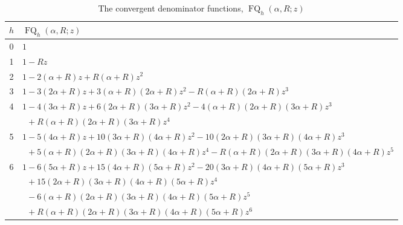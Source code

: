 \documentclass[12pt,reqno]{article}
\numberwithin{sfootnote}{section}
\newcommand{\subtablewidth}{\textwidth}
\newcommand{\subtableskip}{\bigskip}
\newcommand{\tabletopstrut}[0]{\rule{0pt}{3ex}}
\numberwithin{equation}{section}
\theoremstyle{DefaultTheoremStyle}
\theoremstyle{definition}
\newcommand{\ConvFQ}[4]{\ensuremath{\FQ_{#1}\left(#2, #3; #4\right)}}
\DeclareMathOperator{\FQ}{FQ}
\begin{document}
\begin{table}[h]
\begin{subtable}{\subtablewidth}
\begin{tabular}{|c|l|} \hline 
\hline\tabletopstrut 
$h$ & $\ConvFQ{h}{\alpha}{R}{z}$ \\ \hline 
0 & $1$ \\ 
1 & $1-Rz$ \\ 
2 & $1 - 2 (\alpha + R) z + R (\alpha + R) z^2$ \\ 
3 & $1 - 3 (2 \alpha + R) z + 3 (\alpha + R) (2 \alpha + R) z^2 - 
      R (\alpha + R) (2 \alpha + R) z^3$ \\ 
4 & $1 - 4 (3 \alpha + R) z + 6 (2 \alpha + R) (3 \alpha + R) z^2 - 
       4 (\alpha + R) (2 \alpha + R) (3 \alpha + R) z^3$ \\ 
  & $\phantom{1 } + 
     R (\alpha + R) (2 \alpha + R) (3 \alpha + R) z^4$ \\ 
5 & $1 - 5 (4 \alpha + R) z + 10 (3 \alpha + R) (4 \alpha + R) z^2 - 
     10 (2 \alpha + R) (3 \alpha + R) (4 \alpha + R) z^3$ \\ 
  & $\phantom{1 } + 
     5 (\alpha + R) (2 \alpha + R) (3 \alpha + R) (4 \alpha + R) z^4 - 
     R (\alpha + R) (2 \alpha + R) (3 \alpha + R) (4 \alpha + R) z^5$ \\ 
6 & $1 - 6 (5 \alpha + R) z + 15 (4 \alpha + R) (5 \alpha + R) z^2 - 
     20 (3 \alpha + R) (4 \alpha + R) (5 \alpha + R) z^3$ \\ 
  & $\phantom{1 } + 
     15 (2 \alpha + R) (3 \alpha + R) (4 \alpha + R) (5 \alpha + R) z^4$ \\ 
  & $\phantom{1 } - 
     6 (\alpha + R) (2 \alpha + R) (3 \alpha + R) (4 \alpha + R) 
     (5 \alpha + R) z^5$ \\ 
  & $\phantom{1 } + 
     R (\alpha + R) (2 \alpha + R) (3 \alpha + R) (4 \alpha + R) 
     (5 \alpha + R) z^6$ \\ \hline 
\hline 
\end{tabular} 

\caption{The convergent denominator functions, $\ConvFQ{h}{\alpha}{R}{z}$} 

\subtableskip 


\end{subtable}
\end{table}
\end{document}
